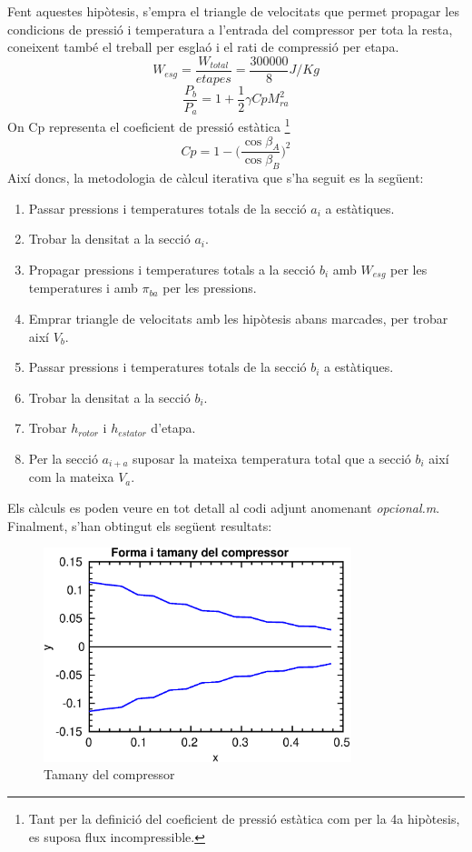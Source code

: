 Fent aquestes hipòtesis, s'empra el triangle de velocitats que permet propagar les condicions de pressió i temperatura a l'entrada del compressor per tota la resta, coneixent també el treball per esglaó i el rati de compressió per etapa.
\begin{equation}
W_{esg} = \frac{W_{total}}{etapes} = \frac{300000}{8} J/Kg
\end{equation}
\begin{equation}
\frac{P_b}{P_a} = 1 + \frac{1}{2}\gamma CpM_{ra}^2
\end{equation}
On Cp representa el coeficient de pressió estàtica \footnote{Tant per la definició del coeficient de pressió estàtica com per la 4a hipòtesis, es suposa flux incompressible.}
\begin{equation}
Cp = 1 - \Big( \frac{\cos{\beta_A}}{\cos{\beta_B}} \Big)^2
\end{equation}
Així doncs, la metodologia de càlcul iterativa que s'ha seguit es la següent:
\begin{enumerate}
\item Passar pressions i temperatures totals de la secció $a_i$ a estàtiques.
\item Trobar la densitat a la secció $a_i$.
\item Propagar pressions i temperatures totals a la secció $b_i$ amb $W_{esg}$ per les temperatures i amb $\pi_{ba}$ per les pressions.
\item Emprar triangle de velocitats amb les hipòtesis abans marcades, per trobar així $V_b$.
\item Passar pressions i temperatures totals de la secció $b_i$ a estàtiques.
\item Trobar la densitat a la secció $b_i$.
\item Trobar $h_{rotor}$ i $h_{estator}$ d'etapa.
\item Per la secció $a_{i+a}$ suposar la mateixa temperatura total que a secció $b_i$ així com la mateixa $V_a$.
\end{enumerate}
Els càlculs es poden veure en tot detall al codi adjunt anomenant \textit{opcional.m}.
Finalment, s'han obtingut els següent resultats:
\begin{figure}[H]
	\centering
	\includegraphics[width=0.8\textwidth]{./code/figures/parametres/compressor_shape.eps}
	\caption{Tamany del compressor}
	\label{shape}
\end{figure}
